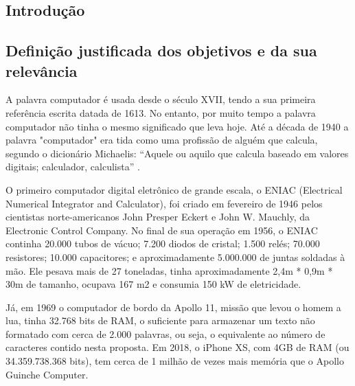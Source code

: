 \begin{samepage}
    \section{Introdução} 
    \vspace{1cm}
    \subsection{Definição justificada dos objetivos e da sua relevância}
     A palavra computador é usada desde o século XVII, tendo a sua primeira referência escrita datada de 1613. No entanto, por muito tempo a palavra computador não tinha o mesmo significado que leva hoje. Até a década de 1940 a palavra "computador" era tida como uma profissão de alguém que calcula, segundo o dicionário Michaelis: “Aquele ou aquilo que calcula baseado em valores digitais; calculador, calculista” \cite{MichaelsComputador}.\par
    O primeiro computador digital eletrônico de grande escala, o ENIAC (Electrical Numerical Integrator and Calculator), foi criado em fevereiro de 1946 pelos cientistas norte-americanos John Presper Eckert e John W. Mauchly, da Electronic Control Company. No final de sua operação em 1956, o ENIAC continha 20.000 tubos de vácuo; 7.200 diodos de cristal; 1.500 relés; 70.000 resistores; 10.000 capacitores; e aproximadamente 5.000.000 de juntas soldadas à mão. Ele pesava mais de 27 toneladas, tinha aproximadamente 2,4m * 0,9m * 30m de tamanho, ocupava 167 m2 e consumia 150 kW de eletricidade. \cite{WazlawickHistoriaDaComputacao}\par
    Já, em 1969 o computador de bordo da Apollo 11, missão que levou o homem a lua, tinha 32.768 bits de RAM, o suficiente para armazenar um texto não formatado com cerca de 2.000 palavras, ou seja, o equivalente ao número de caracteres contido nesta proposta. Em 2018, o iPhone XS, com 4GB de RAM (ou 34.359.738.368 bits), tem cerca de 1 milhão de vezes mais memória que o Apollo Guinche Computer. \cite{UolIphoneVsAppolo}
    

\end{samepage}
